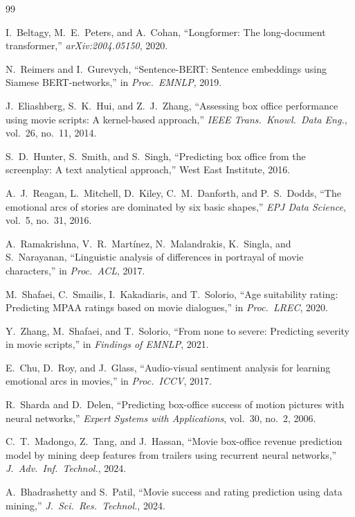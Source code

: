\documentclass[conference,a4paper]{IEEEtran}
\begin{document}
\begin{thebibliography}{99}

I.~Beltagy, M.~E.~Peters, and A.~Cohan, ``Longformer: The long-document
transformer,'' \emph{arXiv:2004.05150}, 2020.

N.~Reimers and I.~Gurevych, ``Sentence-BERT: Sentence embeddings using
Siamese BERT-networks,'' in \emph{Proc.\ EMNLP}, 2019.

J.~Eliashberg, S.~K.~Hui, and Z.~J.~Zhang, ``Assessing box office
performance using movie scripts: A kernel-based approach,''
\emph{IEEE Trans.\ Knowl.\ Data Eng.}, vol.~26, no.~11, 2014.

S.~D.~Hunter, S.~Smith, and S.~Singh, ``Predicting box office from the
screenplay: A text analytical approach,'' West East Institute, 2016.

A.~J.~Reagan, L.~Mitchell, D.~Kiley, C.~M.~Danforth, and P.~S.~Dodds,
``The emotional arcs of stories are dominated by six basic shapes,''
\emph{EPJ Data Science}, vol.~5, no.~31, 2016.

A.~Ramakrishna, V.~R.~Mart{\'i}nez, N.~Malandrakis, K.~Singla, and
S.~Narayanan, ``Linguistic analysis of differences in portrayal of movie
characters,'' in \emph{Proc.\ ACL}, 2017.

M.~Shafaei, C.~Smailis, I.~Kakadiaris, and T.~Solorio, ``Age suitability
rating: Predicting MPAA ratings based on movie dialogues,'' in
\emph{Proc.\ LREC}, 2020.

Y.~Zhang, M.~Shafaei, and T.~Solorio, ``From none to severe: Predicting
severity in movie scripts,'' in \emph{Findings of EMNLP}, 2021.

E.~Chu, D.~Roy, and J.~Glass, ``Audio-visual sentiment analysis for
learning emotional arcs in movies,'' in \emph{Proc.\ ICCV}, 2017.

R.~Sharda and D.~Delen, ``Predicting box-office success of motion
pictures with neural networks,'' \emph{Expert Systems with
Applications}, vol.~30, no.~2, 2006.

C.~T.~Madongo, Z.~Tang, and J.~Hassan, ``Movie box-office revenue
prediction model by mining deep features from trailers using recurrent
neural networks,'' \emph{J.\ Adv.\ Inf.\ Technol.}, 2024.

A.~Bhadrashetty and S.~Patil, ``Movie success and rating prediction
using data mining,'' \emph{J.\ Sci.\ Res.\ Technol.}, 2024.


\end{thebibliography}
\end{document}
